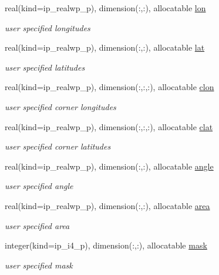 \begin{DoxyCompactItemize}
real(kind=ip\+\_\+realwp\+\_\+p), dimension(\+:,\+:), allocatable \hyperlink{structmod__oasis__grid_1_1prism__grid__type_a4f7fb8a71335506209709cfbe939ef7b}{lon}
\begin{DoxyCompactList}\small\item\em user specified longitudes \end{DoxyCompactList}\item 
real(kind=ip\+\_\+realwp\+\_\+p), dimension(\+:,\+:), allocatable \hyperlink{structmod__oasis__grid_1_1prism__grid__type_aa3a8ae208948be24ac3964c9d660afed}{lat}
\begin{DoxyCompactList}\small\item\em user specified latitudes \end{DoxyCompactList}\item 
real(kind=ip\+\_\+realwp\+\_\+p), dimension(\+:,\+:,\+:), allocatable \hyperlink{structmod__oasis__grid_1_1prism__grid__type_a7aac140b1875e0ecae3a816c0cd6d45e}{clon}
\begin{DoxyCompactList}\small\item\em user specified corner longitudes \end{DoxyCompactList}\item 
real(kind=ip\+\_\+realwp\+\_\+p), dimension(\+:,\+:,\+:), allocatable \hyperlink{structmod__oasis__grid_1_1prism__grid__type_a59d5122daaab45ad6578c7cc8f4fffc8}{clat}
\begin{DoxyCompactList}\small\item\em user specified corner latitudes \end{DoxyCompactList}\item 
real(kind=ip\+\_\+realwp\+\_\+p), dimension(\+:,\+:), allocatable \hyperlink{structmod__oasis__grid_1_1prism__grid__type_a3d12bed9920fed609d83b04ab3fbc5b2}{angle}
\begin{DoxyCompactList}\small\item\em user specified angle \end{DoxyCompactList}\item 
real(kind=ip\+\_\+realwp\+\_\+p), dimension(\+:,\+:), allocatable \hyperlink{structmod__oasis__grid_1_1prism__grid__type_a7dad88f99d9648097a29b6b6f1e25d2e}{area}
\begin{DoxyCompactList}\small\item\em user specified area \end{DoxyCompactList}\item 
integer(kind=ip\+\_\+i4\+\_\+p), dimension(\+:,\+:), allocatable \hyperlink{structmod__oasis__grid_1_1prism__grid__type_ae50e83035d6214d862be48a5060887ae}{mask}
\begin{DoxyCompactList}\small\item\em user specified mask \end{DoxyCompactList}\end{DoxyCompactItemize}


